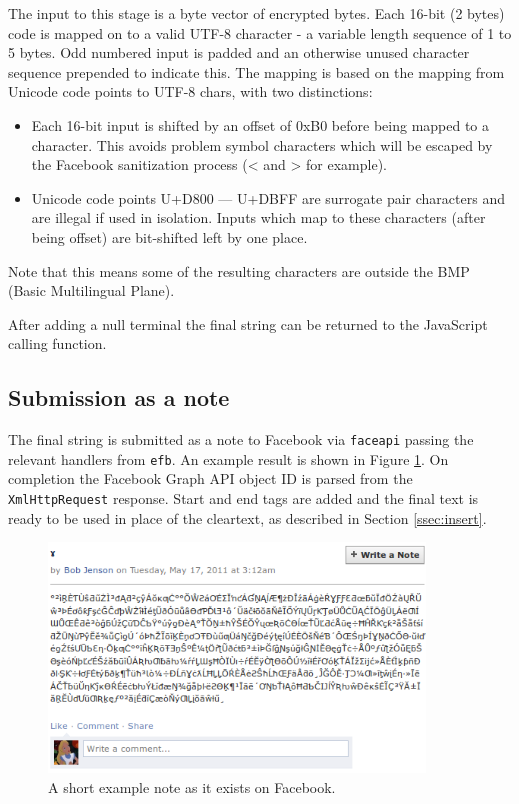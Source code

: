The input to this stage is a byte vector of encrypted bytes. Each 16-bit (2 bytes) code is mapped on to a valid UTF-8 character - a variable length sequence of 1 to 5 bytes. Odd numbered input is padded and an otherwise unused character sequence prepended to indicate this. The mapping is based on the mapping from Unicode code points to UTF-8 chars, with two distinctions:

\begin{itemize}

    \item Each 16-bit input is shifted by an offset of 0xB0 before being mapped to a character. This avoids problem symbol characters which will be escaped by the Facebook sanitization process (< and > for example).
    
    \item Unicode code points U+D800 --- U+DBFF are surrogate pair characters and are illegal if used in isolation. Inputs which map to these characters (after being offset) are bit-shifted left by one place.
    
\end{itemize}


Note that this means some of the resulting characters are outside the BMP (Basic Multilingual Plane).

After adding a null terminal the final string can be returned to the JavaScript calling function.


\FloatBarrier
\subsection{Submission as a note}
\label{ssec:submitnote}

The final string is submitted as a note to Facebook via {\tt faceapi} passing the relevant handlers from {\tt efb}. An example result is shown in Figure \ref{scn:note}. On completion the Facebook Graph API object ID is parsed from the {\tt XmlHttpRequest} response.  Start and end tags are added and the final text is ready to be used in place of the cleartext, as described in Section \ref{ssec:insert}.


    \begin{figure}[tbph]
        \begin{center}
                \includegraphics[width=10cm]{screens/note.png}
            \caption{A short example note as it exists on Facebook.}
            \label{scn:note}
        \end{center}
    \end{figure}

